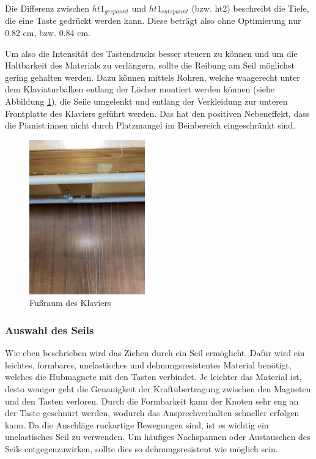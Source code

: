 Die Differenz zwischen $ht1_{gespannt}$ und $ht1_{entspannt}$ (bzw. ht2) beschreibt die Tiefe, die eine Taste gedrückt werden kann.
\newline Diese beträgt also ohne Optimierung nur 0.82 cm, bzw. 0.84 cm. %

Um also die Intensität des Tastendrucks besser steuern zu können und um die Haltbarkeit des Materials zu verlängern,
sollte die Reibung am Seil möglichst gering gehalten werden.
Dazu können mittels Rohren, welche waagerecht unter dem Klaviaturbalken entlang der Löcher montiert werden können (siehe Abbildung \ref{fig:fussraum}), die Seile umgelenkt und
entlang der Verkleidung zur unteren Frontplatte des Klaviers geführt werden.
Das hat den positiven Nebeneffekt, dass die Pianist:innen nicht durch Platzmangel im Beinbereich eingeschränkt sind.


\begin{figure}[htbp]
	\centering
	\includegraphics[width=5cm,angle=-90]{img/Fussraum.jpg}
	\caption{Fußraum des Klaviers}
	\label{fig:fussraum}
\end{figure}


\subsubsection{Auswahl des Seils}

Wie eben beschrieben wird das Ziehen durch ein Seil ermöglicht.
Dafür wird ein leichtes, formbares, unelastisches und dehnungsresistentes Material benötigt, welches die Hubmagnete mit den Tasten verbindet.
Je leichter das Material ist, desto weniger geht die Genauigkeit der Kraftübertragung zwischen den Magneten und den Tasten verloren.
Durch die Formbarkeit kann der Knoten sehr eng an der Taste geschnürt werden, wodurch das Ansprechverhalten schneller erfolgen kann.
Da die Anschläge ruckartige Bewegungen sind, ist es wichtig ein unelastisches Seil zu verwenden.
Um häufiges Nachspannen oder Austauschen des Seils entgegenzuwirken, sollte dies so dehnungsresistent wie möglich sein.

